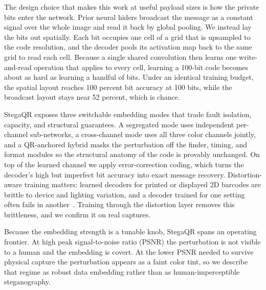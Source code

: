 \documentclass[conference]{IEEEtran}
\begin{document}
The design choice that makes this work at useful payload sizes is how the private bits
enter the network. Prior neural hiders broadcast the message as a constant signal over
the whole image and read it back by global pooling. We instead lay the bits out
spatially. Each bit occupies one cell of a grid that is upsampled to the code resolution,
and the decoder pools its activation map back to the same grid to read each cell. Because
a single shared convolution then learns one write-and-read operation that applies to
every cell, learning a 100-bit code becomes about as hard as learning a handful of bits.
Under an identical training budget, the spatial layout reaches 100 percent bit accuracy
at 100 bits, while the broadcast layout stays near 52 percent, which is chance.

StegaQR exposes three switchable embedding modes that trade fault isolation, capacity,
and structural guarantees. A segregated mode uses independent per-channel sub-networks, a
cross-channel mode uses all three color channels jointly, and a QR-anchored hybrid masks
the perturbation off the finder, timing, and format modules so the structural anatomy of
the code is provably unchanged. On top of the learned channel we apply error-correction
coding, which turns the decoder's high but imperfect bit accuracy into exact message
recovery. Distortion-aware training matters: learned decoders for printed or displayed
2D barcodes are brittle to device and lighting variation, and a decoder trained for one
setting often fails in another~\cite{xie2020lcac}. Training through the distortion layer
removes this brittleness, and we confirm it on real captures.

Because the embedding strength is a tunable knob, StegaQR spans an operating frontier. At
high peak signal-to-noise ratio (PSNR) the perturbation is not visible to a human and the
embedding is covert. At the lower PSNR needed to survive physical capture the
perturbation appears as a faint color tint, so we describe that regime as robust data
embedding rather than as human-imperceptible steganography.
\end{document}
